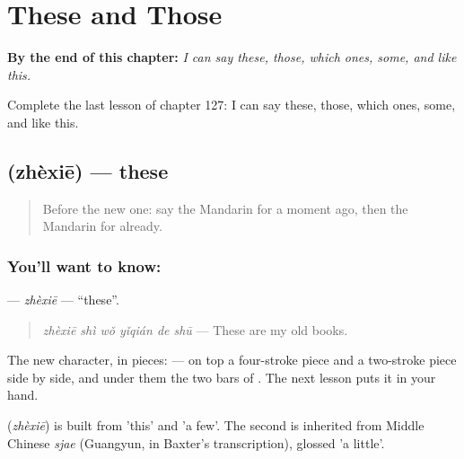 
\chapter{These and Those}
\label{ch:zh-these-and-those}

\begin{chapteropening}
\textbf{By the end of this chapter:} \emph{I can say these, those, which ones, some, and like this.}

Complete the last lesson of chapter 127: I can say these, those, which ones, some, and like this.
\end{chapteropening}

\section[\texorpdfstring{\zh{这些} (zhèxiē)}{这些 (zhèxiē)}]{ (zhèxiē) — these}

\label{lesson:ZH-C127-zhexie}



\begin{quote}
Before the new one: say the Mandarin for a moment ago, then the Mandarin for already.
\end{quote}

\subsection*{You'll want to know: }
\textbf{} — \emph{zhèxiē} — \textquotedblleft{}these\textquotedblright{}.

\begin{quote}
\textbf{} \emph{zhèxiē shì wǒ yǐqián de shū} — These are my old books.
\end{quote}

The new character, in pieces:  — on top a four-stroke piece and a two-stroke piece side by side, and under them the two bars of . The next lesson puts it in your hand.

\begin{cousinweb}
\textbf{} (\emph{zhèxiē}) is built from  'this' and  'a few'. The second is inherited from Middle Chinese \emph{sjae} (Guangyun, in Baxter's transcription), glossed 'a little'.
\end{cousinweb}

